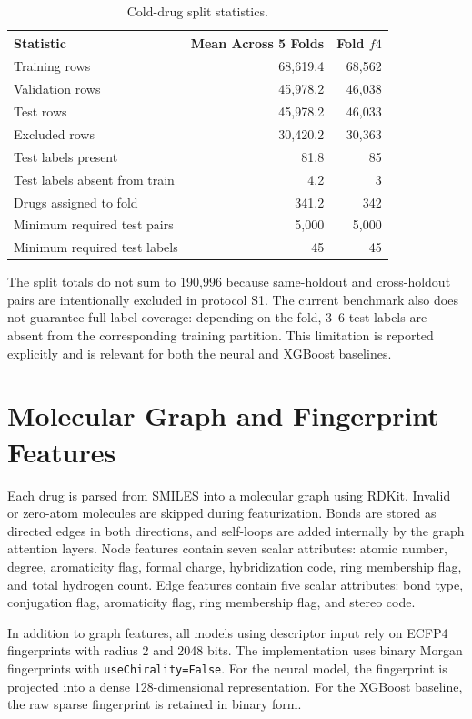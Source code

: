 \begin{table}[H]
\centering
\caption{Cold-drug split statistics.}
\label{tab:split_stats}
\begin{tabular}{lrr}
\toprule
Statistic & Mean Across 5 Folds & Fold \(f4\) \\
\midrule
Training rows & 68{,}619.4 & 68{,}562 \\
Validation rows & 45{,}978.2 & 46{,}038 \\
Test rows & 45{,}978.2 & 46{,}033 \\
Excluded rows & 30{,}420.2 & 30{,}363 \\
Test labels present & 81.8 & 85 \\
Test labels absent from train & 4.2 & 3 \\
Drugs assigned to fold & 341.2 & 342 \\
Minimum required test pairs & 5{,}000 & 5{,}000 \\
Minimum required test labels & 45 & 45 \\
\bottomrule
\end{tabular}
\end{table}

The split totals do not sum to 190{,}996 because same-holdout and cross-holdout pairs are intentionally excluded in protocol S1. The current benchmark also does not guarantee full label coverage: depending on the fold, 3--6 test labels are absent from the corresponding training partition. This limitation is reported explicitly and is relevant for both the neural and XGBoost baselines.

\section{Molecular Graph and Fingerprint Features}
Each drug is parsed from SMILES into a molecular graph using RDKit. Invalid or zero-atom molecules are skipped during featurization. Bonds are stored as directed edges in both directions, and self-loops are added internally by the graph attention layers. Node features contain seven scalar attributes: atomic number, degree, aromaticity flag, formal charge, hybridization code, ring membership flag, and total hydrogen count. Edge features contain five scalar attributes: bond type, conjugation flag, aromaticity flag, ring membership flag, and stereo code.

In addition to graph features, all models using descriptor input rely on ECFP4 fingerprints with radius 2 and 2048 bits. The implementation uses binary Morgan fingerprints with \texttt{useChirality=False}. For the neural model, the fingerprint is projected into a dense 128-dimensional representation. For the XGBoost baseline, the raw sparse fingerprint is retained in binary form.

